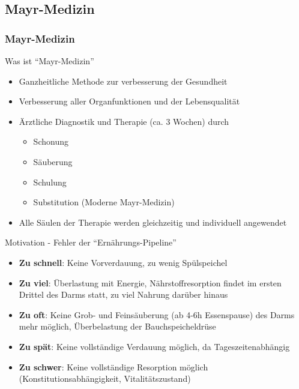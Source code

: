 \documentclass[xcolor=dvipsnames]{beamer}
\begin{document}
    \subsection{Mayr-Medizin}
    \begin{frame}[allowframebreaks]
        \frametitle{Mayr-Medizin}

        \begin{block}{Was ist "`Mayr-Medizin"'}
            \begin{itemize}
                \setlength\itemsep{1em}
                \item Ganzheitliche Methode zur verbesserung der Gesundheit
                \item Verbesserung aller Organfunktionen und der Lebensqualität
                \item Ärztliche Diagnostik und Therapie (ca. 3 Wochen) durch
                \begin{itemize}
                    \item Schonung
                    \item Säuberung
                    \item Schulung
                    \item Substitution (Moderne Mayr-Medizin)
                \end{itemize}
                \item Alle Säulen der Therapie werden gleichzeitig und individuell angewendet
            \end{itemize}
        \end{block}

        \begin{block}{Motivation - Fehler der "`Ernährungs-Pipeline"'}
            \begin{itemize}
                \setlength\itemsep{1em}
                \item \textbf{Zu schnell}: Keine Vorverdauung, zu wenig Spülspeichel
                \item \textbf{Zu viel}: Überlastung mit Energie, Nährstoffresorption findet im ersten Drittel des Darms statt, zu viel Nahrung darüber hinaus
                \item \textbf{Zu oft}: Keine Grob- und Feinsäuberung (ab 4-6h Essenspause) des Darms mehr möglich, Überbelastung der Bauchspeicheldrüse
                \item \textbf{Zu spät}: Keine vollständige Verdauung möglich, da Tageszeitenabhängig
                \item \textbf{Zu schwer}: Keine vollständige Resorption möglich (Konstitutionsabhängigkeit, Vitalitätszustand)
            \end{itemize}
        \end{block}


\end{frame}
\end{document}
